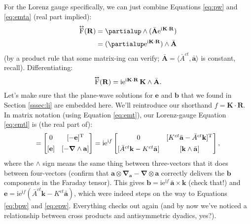 \documentclass[12pt]{article}
\renewcommand{\vv}[1]{\mathbf{#1}}
\newcommand{\del}{\boldsymbol{\nabla}}
\newcommand{\capdy}[1]{ \overset{ \text{\tiny$\bm\leftrightarrow$} }{\vphantom{\text{\small{A}}}\smash{#1}} }
\begin{document}
For the Lorenz gauge specifically, we can just combine Equations \ref{eq:pw} and \ref{eq:emta} (real part implied):
\begin{equation*}
\begin{split}
\capdy{\mathrm{F}} (\vv R) &= \partialup \wedge (  \bar{\vv A} \mathrm{e}^{\mathrm{i} \mkern.5mu \vv K \cdot \vv R} ) \\[2pt]
&= ( \partialup \mathrm{e}^{\mathrm{i} \mkern.5mu \vv K \cdot \vv R} ) \wedge \bar{\vv A}
\end{split}
\end{equation*}
(by a product rule that some matrix-ing can verify; $\bar{\vv A} = \langle \bar{A}^{ct}, \bar{\vv a} \rangle$ is constant, recall). Differentiating:
\begin{equation}\label{eq:emtl}
\capdy{\mathrm{F}} (\vv R) = \mathrm{i} \mathrm{e}^{\mathrm{i} \mkern.5mu \vv K \cdot \vv R} \, \vv K \wedge \bar{\vv A} .
\end{equation}
Let's make sure that the plane-wave solutions for $\vv e$ and $\vv b$ that we found in Section \ref{sssec:li} are embedded here. We'll reintroduce our shorthand $f = \vv K \cdot \vv R$. In matrix notation (using Equation \ref{eq:emt}), our Lorenz-gauge Equation \ref{eq:emtl} is (the real part of):
\begin{equation*}
[ \capdy{\mathrm{F}} ]
=
\begin{bmatrix}
0 & [ - \vv e]^\mathrm{T} \\[1ex]
[\vv e] & [ - \del \wedge \vv a ]
\end{bmatrix}
=
\mathrm{i} \mathrm{e}^{\mathrm{i} f}
\begin{bmatrix}
0 & [K^{ct} \bar{\vv a} - \bar{A}^{ct} \vv k ]^\mathrm{T} \mkern1mu \\[1ex]
[\bar{A}^{ct} \vv k - K^{ct} \bar{\vv a}] & [ \vv k \wedge \bar{\vv a} ] 
\end{bmatrix} ,
\end{equation*}
where the $\wedge$ sign means the same thing between three-vectors that it does between four-vectors (confirm that $\vv a \otimes \del_{\vv a} - \del \otimes \vv a$ correctly delivers the $\vv b$ components in the Faraday tensor). This gives $\vv b = \mathrm{i} \mathrm{e}^{\mathrm{i} f} \, \bar{\vv a} \times \vv k$ (check that!) and $\vv e = \mathrm{i} \mathrm{e}^{\mathrm{i} f} ( \bar{A}^{ct} \vv k - K^{ct} \bar{\vv a} )$, which were indeed steps on the way to Equations \ref{eq:bpw} and \ref{eq:epw}. Everything checks out again (and by now we've noticed a relationship between cross products and antisymmetric dyadics, yes?).
\end{document}
